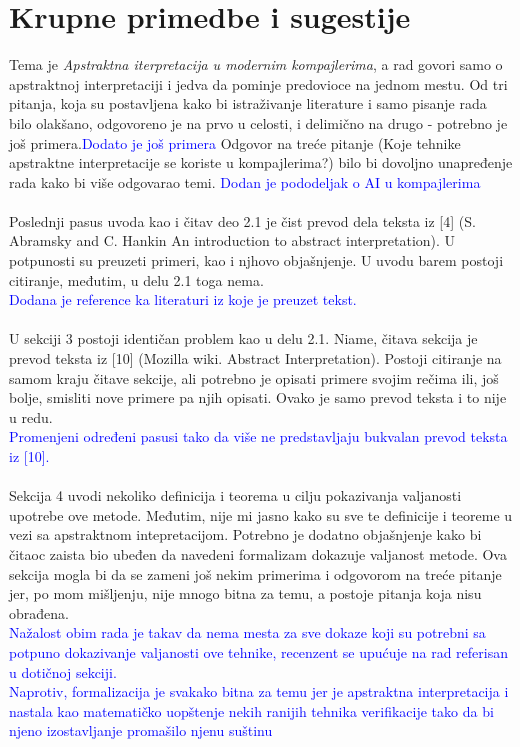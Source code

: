 \documentclass[a4paper]{report}
\newcommand{\odgovor}[1]{\textcolor{blue}{#1}}
\begin{document}
\section{Krupne primedbe i sugestije}
\label{sec: primedbe}
Tema je \textit{Apstraktna iterpretacija u modernim kompajlerima}, a rad govori samo o apstraktnoj interpretaciji i jedva da pominje predovioce na jednom mestu. Od tri pitanja, koja su postavljena kako bi istraživanje literature i samo pisanje rada bilo olakšano, odgovoreno je na prvo u celosti, i delimično na drugo - potrebno je još primera.\odgovor{Dodato je još primera}
 Odgovor na treće pitanje (Koje tehnike apstraktne interpretacije se koriste u kompajlerima?) bilo bi dovoljno unapređenje rada kako bi više odgovarao temi.
 \odgovor{Dodan je pododeljak o AI u kompajlerima}
\\
\\
Poslednji pasus uvoda kao i čitav deo 2.1 je čist prevod dela teksta iz [4] (S. Abramsky and C. Hankin An introduction to abstract interpretation). U potpunosti su preuzeti primeri, kao i njhovo objašnjenje. U uvodu barem postoji citiranje, međutim, u delu 2.1 toga nema.
\\
  \odgovor{Dodana je reference ka literaturi iz koje je preuzet tekst.}
\\
\\
U sekciji 3 postoji identičan problem kao u delu 2.1. Niame, čitava sekcija je prevod teksta iz [10] (Mozilla wiki. Abstract Interpretation). Postoji citiranje na samom kraju čitave sekcije, ali potrebno je opisati primere svojim rečima ili, još bolje, smisliti nove primere pa njih opisati. Ovako je samo prevod teksta i to nije u redu. 
\\
 \odgovor{Promenjeni određeni pasusi tako da više ne predstavljaju bukvalan prevod teksta iz [10].}
\\
\\
Sekcija 4 uvodi nekoliko definicija i teorema u cilju pokazivanja valjanosti upotrebe ove metode. Međutim, nije mi jasno kako su sve te definicije i teoreme u vezi sa apstraktnom intepretacijom. Potrebno je dodatno objašnjenje kako bi čitaoc zaista bio ubeđen da navedeni formalizam dokazuje valjanost metode. Ova sekcija mogla bi da se zameni još nekim primerima i odgovorom na treće pitanje jer, po mom mišljenju, nije mnogo bitna za temu, a postoje pitanja koja nisu obrađena. 
\\
\odgovor{Nažalost obim rada je takav da nema mesta za sve dokaze koji su potrebni sa potpuno dokazivanje valjanosti ove tehnike, recenzent se upućuje na rad referisan u dotičnoj sekciji.} 
\\
\odgovor{Naprotiv, formalizacija je svakako bitna za temu jer je apstraktna interpretacija i nastala kao matematičko uopštenje nekih ranijih tehnika verifikacije tako da bi njeno izostavljanje promašilo njenu suštinu}
\end{document}
